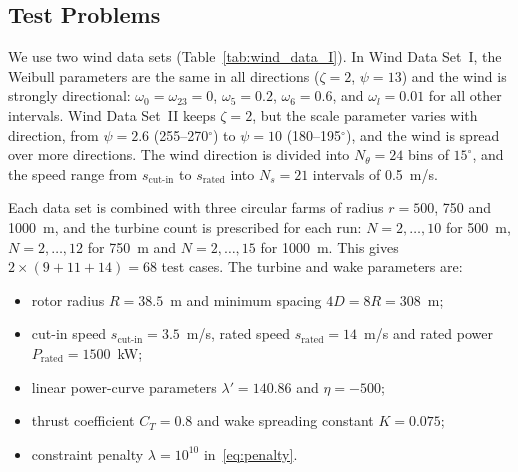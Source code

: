 \documentclass[journal,twoside]{IEEEtran}
\begin{document}
\subsection{Test Problems}
We use two wind data sets (Table~\ref{tab:wind_data_I}). In Wind Data Set~I, the Weibull parameters are the same in all directions ($\zeta=2$, $\psi=13$) and the wind is strongly directional: $\omega_0=\omega_{23}=0$, $\omega_5=0.2$, $\omega_6=0.6$, and $\omega_l=0.01$ for all other intervals. Wind Data Set~II keeps $\zeta=2$, but the scale parameter varies with direction, from $\psi=2.6$ (255--270$^\circ$) to $\psi=10$ (180--195$^\circ$), and the wind is spread over more directions. The wind direction is divided into $N_\theta=24$ bins of $15^\circ$, and the speed range from $s_{\text{cut-in}}$ to $s_{\text{rated}}$ into $N_s=21$ intervals of 0.5~m/s.

Each data set is combined with three circular farms of radius $r=500$, 750 and 1000~m, and the turbine count is prescribed for each run: $N=2,\ldots,10$ for 500~m, $N=2,\ldots,12$ for 750~m and $N=2,\ldots,15$ for 1000~m. This gives $2\times(9+11+14)=68$ test cases. The turbine and wake parameters are:
\begin{itemize}
    \item rotor radius $R=38.5$~m and minimum spacing $4D=8R=308$~m;
    \item cut-in speed $s_{\text{cut-in}}=3.5$~m/s, rated speed $s_{\text{rated}}=14$~m/s and rated power $P_{\text{rated}}=1500$~kW;
    \item linear power-curve parameters $\lambda'=140.86$ and $\eta=-500$;
    \item thrust coefficient $C_T=0.8$ and wake spreading constant $K=0.075$;
    \item constraint penalty $\lambda=10^{10}$ in~\eqref{eq:penalty}.
\end{itemize}
\end{document}
